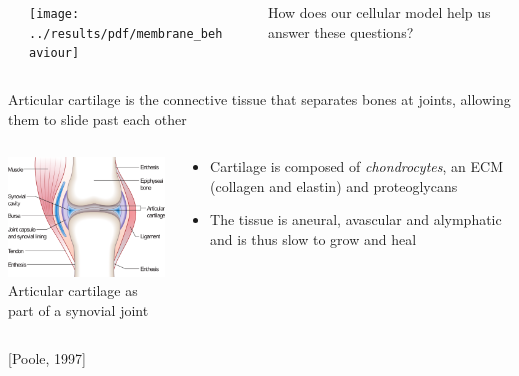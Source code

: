 \documentclass[ignorenonframetext]{beamer}
\newcommand{\references}[1] {
  \begin{flushright}
    \scriptsize [#1] \normalsize
  \end{flushright}
}
\begin{document}
\begin{frame}
\begin{columns}
    \begin{column}{2cm}
    \end{column}
    \begin{column}{2cm}
      \texttt{[image: ../results/pdf/membrane\_behaviour]}
    \end{column}
    \begin{column}{0cm}
    \end{column}
    \begin{column}{7cm}
      How does our cellular model help us answer these questions?
    \end{column}
  \end{columns}
\end{frame}


\begin{frame}{Articular cartilage is the connective tissue that
    separates bones at joints, allowing them to slide past each other}

  \begin{columns}

    \begin{column}{6cm}
      \begin{center}
      \includegraphics[width=6cm]{../images/pdf/joint}
      {\\[-0.1cm] \scriptsize Articular cartilage as part of a
        synovial joint}
      \end{center}
    \end{column}

    \begin{column}{6cm}
      \begin{itemize}
      \item <1-> Cartilage is composed of {\em chondrocytes}, an ECM
        (collagen and elastin) and proteoglycans\\[0.5cm]
        \pause
      \item<2-> The tissue is aneural, avascular and alymphatic and is
        thus slow to grow and heal
      \end{itemize}
    \end{column}

  \end{columns}

  \references{Poole, 1997}

\end{frame}
\end{document}
